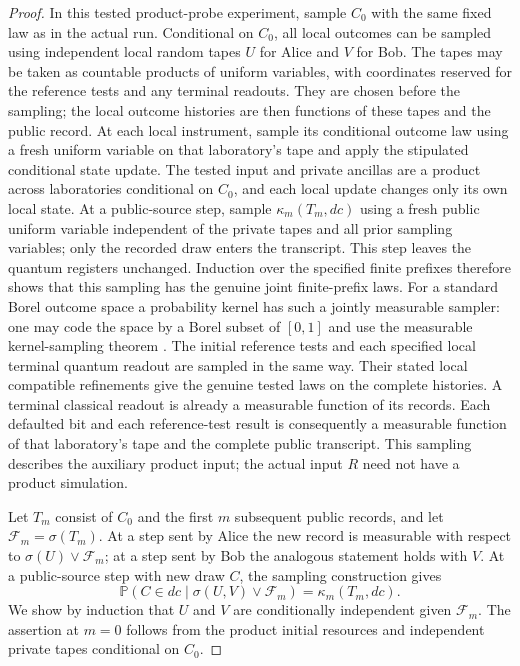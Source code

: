 \begin{proof}
In this tested product-probe experiment, sample $C_0$ with the same fixed
law as in the actual run.  Conditional on $C_0$, all local outcomes can be
sampled using independent local random tapes $U$ for Alice and $V$ for Bob.
The tapes may be taken as countable products of uniform variables, with
coordinates reserved for the reference tests and any terminal readouts.
They are chosen before the sampling; the local outcome histories are then
functions of these tapes and the public record.
At each local instrument, sample
its conditional outcome law using a fresh uniform variable on that
laboratory's tape and apply the stipulated conditional state update.
The tested input and private ancillas are a product across laboratories
conditional on $C_0$, and each local update changes only its own local
state.  At a public-source step, sample $\kappa_m(T_m,dc)$ using a fresh
public uniform variable independent of the private tapes and all prior
sampling variables; only the recorded
draw enters the transcript.  This step leaves the quantum registers
unchanged.  Induction over the specified finite prefixes therefore shows
that this sampling has the genuine joint finite-prefix laws.
For a standard Borel outcome space a probability kernel has such a
jointly measurable sampler: one may code the space by a Borel subset
of $[0,1]$ and use the measurable kernel-sampling theorem
\cite[Appendix~A1, Theorem~A1.2, and Lemma~3.22]{Kallenberg2002}.
The initial reference tests and each specified local terminal quantum
readout are sampled in the same way.  Their stated local compatible
refinements give the genuine tested laws on the complete histories.
A terminal classical readout is
already a measurable function of its records.  Each defaulted bit and
each reference-test result is consequently a measurable function of
that laboratory's tape and the complete public transcript.  This
sampling describes the auxiliary product input; the actual input $R$
need not have a product simulation.

Let $T_m$ consist of $C_0$ and the first $m$ subsequent public records,
and let $\mathcal F_m=\sigma(T_m)$.  At a step sent by Alice the new
record is measurable with respect to
$\sigma(U)\vee\mathcal F_m$; at a step sent by Bob the analogous
statement holds with $V$.  At a public-source step with new draw $C$,
the sampling construction gives
\[
 \mathbb P(C\in dc\mid\sigma(U,V)\vee\mathcal F_m)=\kappa_m(T_m,dc).
\]
We show by induction that $U$ and $V$ are conditionally independent
given $\mathcal F_m$.  The assertion at $m=0$ follows from the product
initial resources and independent private tapes conditional on $C_0$.


\end{proof}
